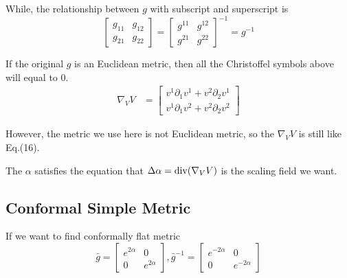 \documentclass{article}
\theoremstyle{definition}
\theoremstyle{plain}
\begin{document}
While, the relationship between $ g$ with subscript and superscript is
\begin{equation}
    \left[\begin{array}{cc}
         g_{11} &  g_{12} \\
         g_{21} &  g_{22}
    \end{array}\right]
    =
    \left[\begin{array}{cc}
         g^{11} &  g^{12} \\
         g^{21} &  g^{22}
    \end{array}\right]^{-1}=g^{-1}
\end{equation}

If the original $g$ is an Euclidean metric, then all the Christoffel symbols above will equal to 0. 
\begin{align}
    \nabla_V V&=
    \left[\begin{array}{c}
    v^1\partial_1 v^1+v^2\partial_2 v^1\\
    v^1\partial_1 v^2+v^2\partial_2 v^2
    \end{array}\right]
\end{align}

However, the metric we use here is not Euclidean metric, so the $\nabla_VV$ is still like
Eq.(16).

The $\alpha$ satisfies the equation that $\Delta \alpha={\rm div}(\nabla_VV)$ is the scaling field we want.\\

\subsection{Conformal Simple Metric}
If we want to find conformally flat metric
\begin{equation}
    \bar{g}=\left[\begin{array}{cc}
         e^{2\alpha} &  0 \\
         0 &  e^{2\alpha}
    \end{array}\right], 
    \bar{g}^{-1}=\left[\begin{array}{cc}
         e^{-2\alpha} &  0 \\
         0 &  e^{-2\alpha}
    \end{array}\right]
\end{equation}
\end{document}
